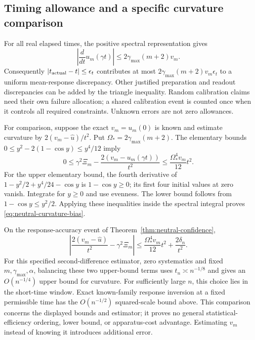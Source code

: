 \documentclass[11pt]{article}
\theoremstyle{definition}
\begin{document}
\subsection{Timing allowance and a specific curvature comparison}
\label{sec:neutral-error-budget}

For all real elapsed times, the positive spectral representation gives
\[
 \left|\frac{d}{dt}u_m(\gamma t)\right|
 \le2\gamma_{\max}(m+2)v_m .
\]
Consequently $|t_{\rm actual}-t|\le\epsilon_t$ contributes at most
$2\gamma_{\max}(m+2)v_m\epsilon_t$ to a uniform mean-response discrepancy.
Other justified preparation and readout discrepancies can be added by the
triangle inequality. Random calibration claims need their own failure
allocation; a shared calibration event is counted once when it controls
all required constraints. Unknown errors are not zero allowances.

For comparison, suppose the exact $v_m=u_m(0)$ is known and estimate
curvature by $2(v_m-\widehat u)/t^2$. Put
$\Omega_*=2\gamma_{\max}(m+2)$. The elementary bounds
$0\le y^2-2(1-\cos y)\le y^4/12$ imply
\begin{equation}
 0\le\gamma^2\Xi_m-
      \frac{2(v_m-u_m(\gamma t))}{t^2}
 \le\frac{\Omega_*^4v_m}{12}t^2.
 \label{eq:neutral-curvature-bias}
\end{equation}
For the upper elementary bound, the fourth derivative of
$1-y^2/2+y^4/24-\cos y$ is $1-\cos y\ge0$; its first four
initial values at zero vanish. Integrate for $y\ge0$ and use evenness.
The lower bound follows from $1-\cos y\le y^2/2$.
Applying these inequalities inside the spectral integral proves
\eqref{eq:neutral-curvature-bias}.

On the response-accuracy event of Theorem~\ref{thm:neutral-confidence},
\[
 \left|\frac{2(v_m-\widehat u)}{t^2}-\gamma^2\Xi_m\right|
 \le \frac{\Omega_*^4v_m}{12}t^2+\frac{2\delta_n}{t^2}.
\]
For this specified second-difference estimator, zero systematics and fixed
$m,\gamma_{\max},\alpha$, balancing these two upper-bound terms uses
$t_n\asymp n^{-1/8}$ and gives an $O(n^{-1/4})$ upper bound for curvature.
For sufficiently large $n$, this choice lies in the short-time window.
Exact known-family response inversion at a fixed permissible time has the
$O(n^{-1/2})$ squared-scale bound above. This comparison concerns the
displayed bounds and estimator; it proves no general statistical-efficiency
ordering, lower bound, or apparatus-cost advantage. Estimating $v_m$
instead of knowing it introduces additional error.
\end{document}
